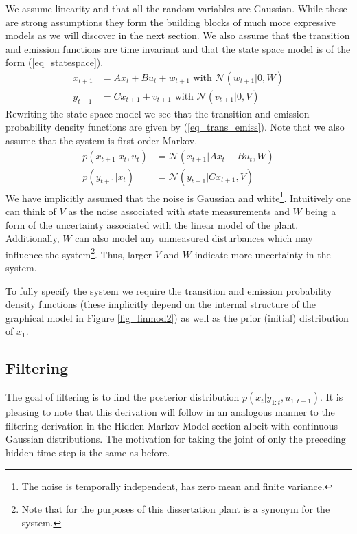 We assume linearity and that all the random variables are Gaussian. While these are strong assumptions they form the building blocks of much more expressive models as we will discover in the next section. We also assume that the transition and emission functions are time invariant and that the state space model is of the form (\ref{eq_statespace}).
\begin{equation}
\begin{aligned}
x_{t+1} &= Ax_t + Bu_t + w_{t+1} \text{ with } \mathcal{N}(w_{t+1}|0,W) \\
y_{t+1} &= Cx_{t+1} + v_{t+1}  \text{ with } \mathcal{N}(v_{t+1}|0,V)
\end{aligned}
\label{eq_statespace}
\end{equation}
Rewriting the state space model we see that the transition and emission probability density functions are given by (\ref{eq_trans_emiss}). Note that we also assume that the system is first order Markov.
\begin{equation}
\begin{aligned}
p(x_{t+1}|x_t, u_t)&= \mathcal{N}(x_{t+1}|Ax_t+Bu_t, W) \\
p(y_{t+1}|x_t) &= \mathcal{N}(y_{t+1}|Cx_{t+1}, V)
\end{aligned}
\label{eq_trans_emiss}
\end{equation}
We have implicitly assumed that the noise is Gaussian and white\footnote{The noise is temporally independent, has zero mean and finite variance.}. Intuitively one can think of $V$ as the noise associated with state measurements and $W$ being a form of the uncertainty associated with the linear model of the plant. Additionally, $W$ can also model any unmeasured disturbances which may influence the system\footnote{Note that for the purposes of this dissertation plant is a synonym for the system.}. Thus, larger $V$ and $W$ indicate more uncertainty in the system. 

To fully specify the system we require the transition and emission probability density functions (these implicitly depend on the internal structure of the graphical model in Figure \ref{fig_linmod2}) as well as the prior (initial) distribution of $x_1$.

\subsection{Filtering}
The goal of filtering is to find the posterior distribution $p(x_{t}|y_{1:t}, u_{1:t-1})$. It is pleasing to note that this derivation will follow in an analogous manner to the filtering derivation in the Hidden Markov Model section albeit with continuous Gaussian distributions. The motivation for taking the joint of only the preceding hidden time step is the same as before. 

